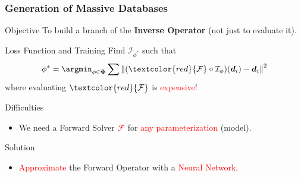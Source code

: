 \begin{frame}
    \frametitle{Generation of Massive Databases}    
\vspace{-2mm}

\begin{block}{Objective}
	\centering
	To build a branch of the \textbf{Inverse Operator} (not just to evaluate it).
\end{block}

\begin{block}{Loss Function and Training}
Find $\mathcal{I}_{\phi^*}$ such that
\[
\phi^* = \argmin_{\phi \in \boldsymbol{\Phi}} \sum \left\| (\textcolor{red}{\mathcal{F}} \circ \mathcal{I}_{\phi})(\boldsymbol{d}_i) - \boldsymbol{d}_i \right\|^2
\]
where evaluating $\textcolor{red}{\mathcal{F}}$ is \textcolor{red}{expensive}!
\end{block}
    
\begin{block}{Difficulties}
    \begin{itemize}
        \item We need a Forward Solver \textcolor{red}{$\mathcal{F}$} for \textcolor{red}{any parameterization} (model).
    \end{itemize}
\end{block}

\begin{block}{Solution}
    \begin{itemize}
        \item  \textcolor{red}{Approximate} the Forward Operator with a  \textcolor{red}{Neural Network}.
    \end{itemize}
\end{block}

\end{frame}